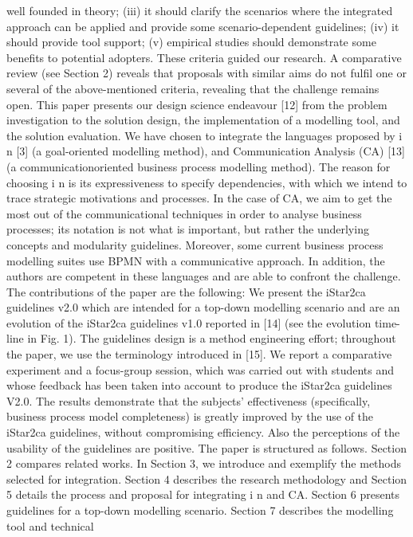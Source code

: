 well founded in theory; (iii) it should clarify the scenarios
where the integrated approach can be applied and provide
some scenario-dependent guidelines; (iv) it should provide tool support; (v) empirical studies should demonstrate some benefits to potential adopters. These criteria
guided our research. A comparative review (see Section 2)
reveals that proposals with similar aims do not fulfil one or
several of the above-mentioned criteria, revealing that the
challenge remains open.
This paper presents our design science endeavour [12]
from the problem investigation to the solution design, the
implementation of a modelling tool, and the solution
evaluation. We have chosen to integrate the languages
proposed by i
n
[3] (a goal-oriented modelling method),
and Communication Analysis (CA) [13] (a communicationoriented business process modelling method). The reason
for choosing i
n
is its expressiveness to specify dependencies, with which we intend to trace strategic motivations
and processes. In the case of CA, we aim to get the most
out of the communicational techniques in order to analyse
business processes; its notation is not what is important,
but rather the underlying concepts and modularity guidelines. Moreover, some current business process modelling
suites use BPMN with a communicative approach. In
addition, the authors are competent in these languages
and are able to confront the challenge.
The contributions of the paper are the following:
 We present the iStar2ca guidelines v2.0 which are
intended for a top-down modelling scenario and are
an evolution of the iStar2ca guidelines v1.0 reported in
[14] (see the evolution time-line in Fig. 1). The guidelines design is a method engineering effort; throughout
the paper, we use the terminology introduced in [15].
 We report a comparative experiment and a focus-group
session, which was carried out with students and
whose feedback has been taken into account to produce the iStar2ca guidelines V2.0. The results demonstrate that the subjects' effectiveness (specifically,
business process model completeness) is greatly
improved by the use of the iStar2ca guidelines, without
compromising efficiency. Also the perceptions of the
usability of the guidelines are positive.
The paper is structured as follows. Section 2 compares
related works. In Section 3, we introduce and exemplify
the methods selected for integration. Section 4 describes
the research methodology and Section 5 details the process and proposal for integrating i
n
and CA. Section 6
presents guidelines for a top-down modelling scenario.
Section 7 describes the modelling tool and technical
